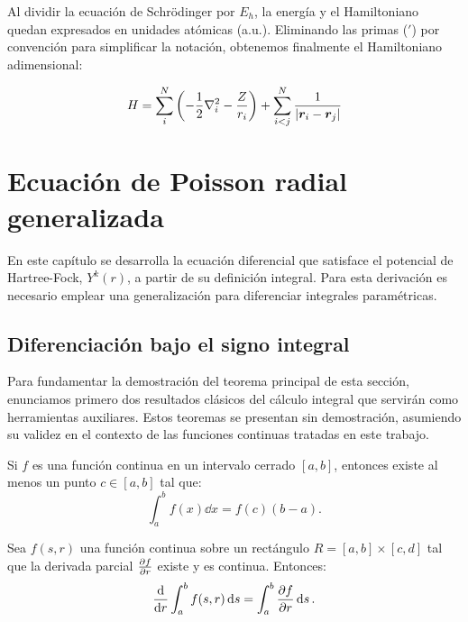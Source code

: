 \documentclass[12pt, a4paper, oneside, spanish]{book}
\begin{document}
Al dividir la ecuación de Schrödinger por $E_h$, la energía y el Hamiltoniano quedan expresados en unidades atómicas (a.u.). Eliminando las primas ($'$) por convención para simplificar la notación, obtenemos finalmente el Hamiltoniano adimensional:

\begin{equation}
  \label{eq:hamiltonian1}
  H = \sum_i^N \qty(- \frac{1}{2}\nabla_i^2 - \frac{Z}{r_i}) + \sum_{i<j}^N \frac{1}{\abs{\bm{r}_i-\bm{r}_j}}
\end{equation}

\chapter{Ecuación de Poisson radial generalizada}
\label{apendice:poisson}

En este capítulo se desarrolla la ecuación diferencial que satisface el potencial de Hartree-Fock, \( Y^k(r) \), a partir de su definición integral. Para esta derivación es necesario emplear una generalización para diferenciar integrales paramétricas.

\section{Diferenciación bajo el signo integral}

Para fundamentar la demostración del teorema principal de esta sección, enunciamos primero dos resultados clásicos del cálculo integral que servirán como herramientas auxiliares. Estos teoremas se presentan sin demostración, asumiendo su validez en el contexto de las funciones continuas tratadas en este trabajo.

\begin{theorem}\label{thm:valor-medio}
  Si \( f \) es una función continua en un intervalo cerrado \( [a,b] \), entonces existe al menos un punto \( c \in [a,b] \) tal que:
  \[
  \int_{a}^{b} f(x) \dd{x} = f(c)(b-a).
  \]
\end{theorem}

\begin{theorem}\label{thm:leibniz-constante}
  Sea \( f(s,r) \) una función continua sobre un rectángulo \( R = [a,b] \times [c,d] \) tal que la derivada parcial \( \pdv{f}{r} \) existe y es continua. Entonces:
  \[
  \dv{r} \int_{a}^{b} f(s,r) \dd{s} = \int_{a}^{b} \pdv{f}{r}(s,r) \dd{s}.
  \]
\end{theorem}
\end{document}
